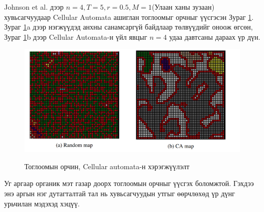 Johnson et al. \cite{CellularAutomata} дээр \(n=4, T=5, r=0.5, M=1\)(Улаан ханы зузаан) хувьсагчуудаар Cellular Automata ашиглан тоглоомыг орчныг үүсгэсэн Зураг \ref{fig:CellularAutomataImplementation}. Зураг \ref{fig:CellularAutomataImplementation}a дээр нэгжүүдэд анхны санамсаргүй байдлаар төлвүүдийг оноож өгсөн, Зураг \ref{fig:CellularAutomataImplementation}b дээр Cellular Automata-н үйл явцыг \(n=4\) удаа давтсаны дараах үр дүн.
\begin{figure}[H]
	\centering
	\caption{Тоглоомын орчин, Cellular automata-н хэрэгжүүлэлт}
	\includegraphics[width=\textwidth]{./images/cellular_automata_implementation.png}
	\label{fig:CellularAutomataImplementation}
\end{figure}

Уг аргаар органик мэт газар доорх тоглоомын орчныг үүсгэх боломжтой. Гэхдээ энэ аргын нэг дутагталтай тал нь хувьсагчуудын утгыг өөрчлөхөд үр дүнг урьчилан мэдэхэд хэцүү.


